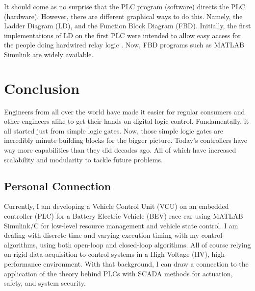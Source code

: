 \documentclass[12pt]{article}
\begin{document}
        It should come as no surprise that the PLC program (software) directs the 
        PLC (hardware). However, there are different graphical ways to do this. 
        Namely, the Ladder Diagram (LD), and the Function Block Diagram (FBD).
        Initially, the first implementations of LD on the first PLC were intended
        to allow easy access for the people doing hardwired relay logic 
        \autocite[3]{Frey2014}. Now, FBD programs such as MATLAB Simulink are widely 
        available.

        
    \section{Conclusion}
    
    Engineers from all over the world have made it easier for regular consumers
    and other engineers alike to get their hands on digital logic control. 
    Fundamentally, it all started just from simple logic gates. Now, those simple 
    logic gates are incredibly minute building blocks for the bigger picture. Today's
    controllers have way more capabilities than they did decades ago. All of which
    have increased scalability and modularity to tackle future problems.
    
    \subsection{Personal Connection}

    Currently, I am developing a Vehicle Control Unit (VCU) on an 
    embedded controller (PLC) for a Battery Electric Vehicle (BEV) race car using MATLAB 
    Simulink/C for low-level resource management and vehicle state control. 
    I am dealing with discrete-time and varying execution timing with my control 
    algorithms, using both open-loop and closed-loop algorithms. All of course 
    relying on rigid data acquisition to control systems 
    in a High Voltage (HV), high-performance environment. With that 
    background, I can draw a connection to the application of the theory behind PLCs 
    with SCADA methods for actuation, safety, and system security. 
    
    \newpage
    \printbibliography[title=Works Cited]


    
\end{document}
